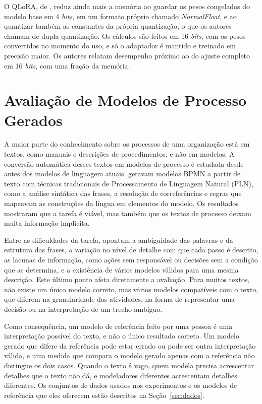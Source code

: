 O QLoRA, de , reduz ainda mais a memória ao guardar os pesos congelados do modelo base em 4 \textit{bits}, em um formato próprio chamado \textit{NormalFloat}, e ao quantizar também as constantes da própria quantização, o que os autores chamam de dupla quantização. Os cálculos são feitos em 16 \textit{bits}, com os pesos convertidos no momento do uso, e só o adaptador é mantido e treinado em precisão maior. Os autores relatam desempenho próximo ao do ajuste completo em 16 \textit{bits}, com uma fração da memória.

\section{Avaliação de Modelos de Processo Gerados}
\label{sec:nl-bpmn}\label{sec:metricas}\label{subsec:precisao-recall}\label{subsec:juiz}

A maior parte do conhecimento sobre os processos de uma organização está em textos, como manuais e descrições de procedimentos, e não em modelos. A conversão automática desses textos em modelos de processo é estudada desde antes dos modelos de linguagem atuais.  geravam modelos BPMN a partir de texto com técnicas tradicionais de Processamento de Linguagem Natural (PLN), como a análise sintática das frases, a resolução de correferências e regras que mapeavam as construções da língua em elementos do modelo. Os resultados mostraram que a tarefa é viável, mas também que os textos de processo deixam muita informação implícita.

Entre as dificuldades da tarefa,  apontam a ambiguidade das palavras e da estrutura das frases, a variação no nível de detalhe com que cada passo é descrito, as lacunas de informação, como ações sem responsável ou decisões sem a condição que as determina, e a existência de vários modelos válidos para uma mesma descrição. Este último ponto afeta diretamente a avaliação. Para muitos textos, não existe um único modelo correto, mas vários modelos compatíveis com o texto, que diferem na granularidade das atividades, na forma de representar uma decisão ou na interpretação de um trecho ambíguo.

Como consequência, um modelo de referência feito por uma pessoa é uma interpretação possível do texto, e não o único resultado correto. Um modelo gerado que difere da referência pode estar errado ou pode ser outra interpretação válida, e uma medida que compara o modelo gerado apenas com a referência não distingue os dois casos. Quando o texto é vago, quem modela precisa acrescentar detalhes que o texto não dá, e modeladores diferentes acrescentam detalhes diferentes. Os conjuntos de dados usados nos experimentos e os modelos de referência que eles oferecem estão descritos na Seção~\ref{sec:dados}.

